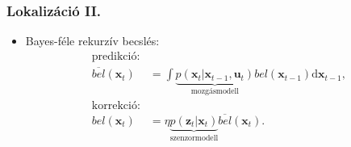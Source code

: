 \documentclass{beamer}
\begin{document}
\begin{frame}
    \frametitle{Lokalizáció II.}
    \begin{itemize}
        \item Bayes-féle rekurzív becslés:
              \begin{align}
                  \text{predikció:}   \nonumber                                                                                                                                                                     \\
                  \overline{bel}(\mathbf{x}_t) & = \int \underbrace{p(\mathbf{x}_t | \mathbf{x}_{t-1},\mathbf{u}_t)}_{\text{mozgásmodell}}bel(\mathbf{x}_{t-1})\mathrm{d}\mathbf{x}_{t-1}, \label{eq:bayes-predict} \\
                  \text{korrekció:}  \nonumber                                                                                                                                                                      \\
                  bel(\mathbf{x}_t)            & = \eta \underbrace{p(\mathbf{\mathbf{z}}_t | \mathbf{x}_t)}_{\text{szenzormodell}}\overline{bel}(\mathbf{x}_t).
              \end{align}
    \end{itemize}
\end{frame}
\end{document}
